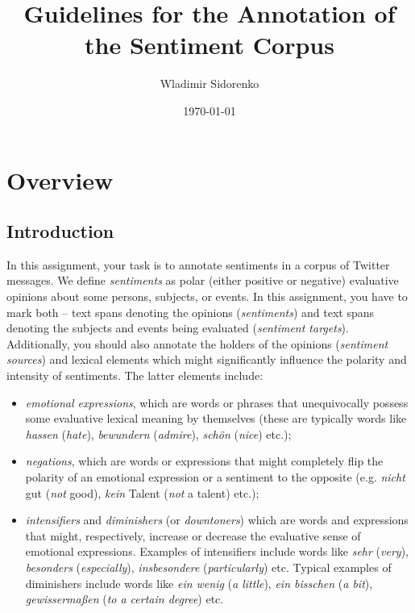 \documentclass[11pt,a4paper]{article}
\author{Wladimir Sidorenko}
\date{\today}
\title{Guidelines for the Annotation of the Sentiment Corpus}
\theoremstyle{mytheoremstyle}
\begin{document}
\maketitle{}
\section{Overview}
\subsection{Introduction}

In this assignment, your task is to annotate sentiments in a corpus of
Twitter messages.  We define \emph{sentiments} as polar (either
positive or negative) evaluative opinions about some persons,
subjects, or events.  In this assignment, you have to mark both --
text spans denoting the opinions (\emph{sentiments}) and text spans
denoting the subjects and events being evaluated (\emph{sentiment
  targets}).  Additionally, you should also annotate the holders of
the opinions (\emph{sentiment sources}) and lexical elements which
might significantly influence the polarity and intensity of
sentiments.  The latter elements include:
\begin{itemize}
  \item \emph{emotional expressions}, which are words or phrases that
    unequivocally possess some evaluative lexical meaning by
    themselves (these are typically words like \emph{hassen}
    (\emph{hate}), \emph{bewundern} (\emph{admire}), \emph{sch\"on}
    (\emph{nice}) etc.);
  \item \emph{negations}, which are words or expressions that might
    completely flip the polarity of an emotional expression or a
    sentiment to the opposite (e.g. \emph{nicht} gut (\emph{not}
    good), \emph{kein} Talent (\emph{not} a talent) etc.);
  \item \emph{intensifiers} and \emph{diminishers} (or
    \emph{downtoners}) which are words and expressions that might,
    respectively, increase or decrease the evaluative sense of
    emotional expressions.  Examples of intensifiers include words
    like \emph{sehr} (\emph{very}), \emph{besonders}
    (\emph{especially}), \emph{insbesondere} (\emph{particularly})
    etc.  Typical examples of diminishers include words like \emph{ein
      wenig} (\emph{a little}), \emph{ein bisschen} (\emph{a bit}),
    \emph{gewisserma\ss{}en} (\emph{to a certain degree}) etc.
\end{itemize}
\end{document}
